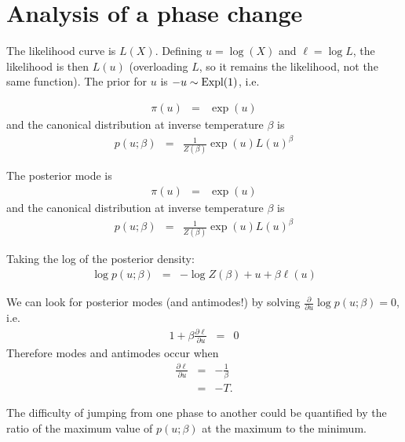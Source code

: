 \documentclass[a4paper, 11pt]{article}
\title{}
\author{}
\begin{document}
\maketitle



\section{Analysis of a phase change}
The likelihood curve is $L(X)$. Defining $u = \log(X)$ and $\ell = \log L$, the likelihood is
then $L(u)$ (overloading $L$, so it remains the likelihood, not the same
function). The prior for $u$ is $-u \sim \textnormal{Expl}(1)$, i.e.

\begin{eqnarray}
\pi(u) &=& \exp(u)
\end{eqnarray}
and the canonical distribution at inverse temperature $\beta$ is
\begin{eqnarray}
p(u; \beta) &=& \frac{1}{Z(\beta)}\exp(u)L(u)^\beta
\end{eqnarray}

The posterior mode is
\begin{eqnarray}
\pi(u) &=& \exp(u)
\end{eqnarray}
and the canonical distribution at inverse temperature $\beta$ is
\begin{eqnarray}
p(u; \beta) &=& \frac{1}{Z(\beta)}\exp(u)L(u)^\beta
\end{eqnarray}

Taking the log of the posterior density:
\begin{eqnarray}
\log p(u; \beta) &=& -\log Z(\beta) + u + \beta \ell(u)
\end{eqnarray}

We can look for posterior modes (and antimodes!) by solving
$\frac{\partial}{\partial u} \log p(u; \beta) = 0$, i.e.
\begin{eqnarray}
1 + \beta \frac{\partial \ell}{\partial u} &=& 0
\end{eqnarray}
Therefore modes and antimodes occur when
\begin{eqnarray}
\frac{\partial \ell}{\partial u} &=& -\frac{1}{\beta}\\
&=& -T.
\end{eqnarray}

The difficulty of jumping from one phase to another could be quantified by
the ratio of the maximum value of $p(u; \beta)$ at the maximum to the minimum.

\newpage
\end{document}

